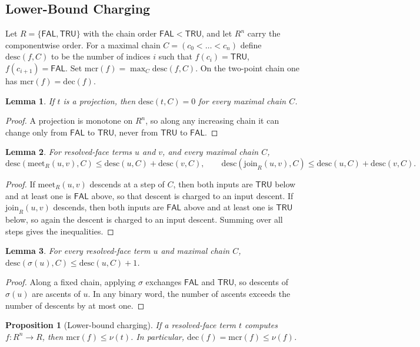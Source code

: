 \documentclass[11pt]{article}
\newtheorem{lemma}{Lemma}
\newtheorem{proposition}{Proposition}
\theoremstyle{remark}
\newcommand{\FAL}{\ensuremath{\mathsf{FAL}}}
\newcommand{\TRU}{\ensuremath{\mathsf{TRU}}}
\newcommand{\meetR}{\ensuremath{\mathrm{meet}_R}}
\newcommand{\joinR}{\ensuremath{\mathrm{join}_R}}
\newcommand{\mcr}{\ensuremath{\mathrm{mcr}}}
\newcommand{\dec}{\ensuremath{\mathrm{dec}}}
\newcommand{\desc}{\mathrm{desc}}
\begin{document}
\subsection{Lower-Bound Charging}

Let $R=\{\FAL,\TRU\}$ with the chain order $\FAL<\TRU$, and let $R^n$ carry
the componentwise order. For a maximal chain $C=(c_0<\dots<c_n)$ define
$\desc(f,C)$ to be the number of indices $i$ such that $f(c_i)=\TRU$,
$f(c_{i+1})=\FAL$. Set $\mcr(f)=\max_C \desc(f,C)$. On the two-point chain
one has $\mcr(f)=\dec(f)$.

\begin{lemma}\label{lem:D1}
If $t$ is a projection, then $\desc(t,C)=0$ for every maximal chain $C$.
\end{lemma}

\begin{proof}
A projection is monotone on $R^n$, so along any increasing chain it can
change only from $\FAL$ to $\TRU$, never from $\TRU$ to $\FAL$.
\end{proof}

\begin{lemma}\label{lem:D2}
For resolved-face terms $u$ and $v$, and every maximal chain $C$,
\[
\desc(\meetR(u,v),C)\le\desc(u,C)+\desc(v,C),\qquad
\desc(\joinR(u,v),C)\le\desc(u,C)+\desc(v,C).
\]
\end{lemma}

\begin{proof}
If $\meetR(u,v)$ descends at a step of $C$, then both inputs are $\TRU$
below and at least one is $\FAL$ above, so that descent is charged to an
input descent. If $\joinR(u,v)$ descends, then both inputs are $\FAL$ above
and at least one is $\TRU$ below, so again the descent is charged to an
input descent. Summing over all steps gives the inequalities.
\end{proof}

\begin{lemma}\label{lem:D3}
For every resolved-face term $u$ and maximal chain $C$,
$\desc(\sigma(u),C)\le\desc(u,C)+1$.
\end{lemma}

\begin{proof}
Along a fixed chain, applying $\sigma$ exchanges $\FAL$ and $\TRU$, so
descents of $\sigma(u)$ are ascents of $u$. In any binary word, the number
of ascents exceeds the number of descents by at most one.
\end{proof}

\begin{proposition}[Lower-bound charging]\label{prop:D4}
If a resolved-face term $t$ computes $f:R^n\to R$, then $\mcr(f)\le\nu(t)$.
In particular, $\dec(f)=\mcr(f)\le\nu(f)$.
\end{proposition}
\end{document}
